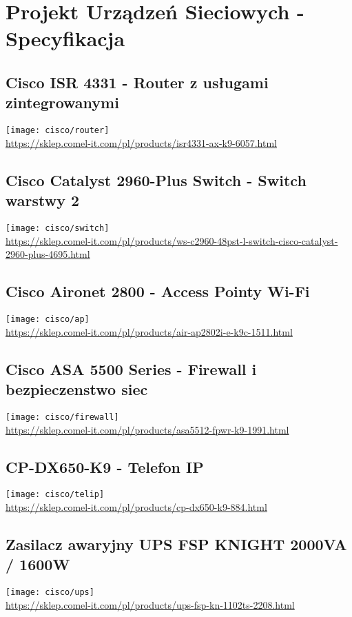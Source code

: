 \section{Projekt Urządzeń Sieciowych - Specyfikacja}

\subsection{Cisco ISR 4331  - Router z usługami zintegrowanymi}

    \texttt{[image: cisco/router]} \\
    \url{https://sklep.comel-it.com/pl/products/isr4331-ax-k9-6057.html}


\subsection{Cisco Catalyst 2960-Plus Switch - Switch warstwy 2}
    \texttt{[image: cisco/switch]} \\
   \url{https://sklep.comel-it.com/pl/products/ws-c2960-48pst-l-switch-cisco-catalyst-2960-plus-4695.html}

\subsection{Cisco Aironet 2800 - Access Pointy Wi-Fi}
    \texttt{[image: cisco/ap]} \\
    \url{https://sklep.comel-it.com/pl/products/air-ap2802i-e-k9c-1511.html}

\subsection{Cisco ASA 5500 Series -  Firewall i bezpieczenstwo siec}
    \texttt{[image: cisco/firewall]} \\
    \url{https://sklep.comel-it.com/pl/products/asa5512-fpwr-k9-1991.html}

\subsection{CP-DX650-K9 - Telefon IP}
    \texttt{[image: cisco/telip]} \\
    \url{https://sklep.comel-it.com/pl/products/cp-dx650-k9-884.html}

\subsection{Zasilacz awaryjny UPS FSP KNIGHT 2000VA / 1600W}
    \texttt{[image: cisco/ups]} \\
    \url{https://sklep.comel-it.com/pl/products/ups-fsp-kn-1102ts-2208.html}

